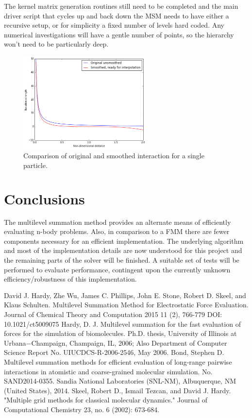 \documentclass[review]{siamart}
\begin{document}
The kernel matrix generation routines still need to be completed and the main driver script that cycles up and back down the MSM needs to have either a recursive setup, or for simplicity a fixed number of levels hard coded. Any numerical investigations will have a gentle number of points, so the hierarchy won't need to be particularly deep.



\begin{figure}[!htb]
\centering
\includegraphics[width=0.6\textwidth]{smooth.PNG}
\caption{Comparison of original and smoothed interaction for a single particle.}
\end{figure}

\section{Conclusions}\label{sec:conc}
The multilevel summation method provides an alternate means of efficiently evaluating n-body problems. Also, in comparison to a FMM there are fewer components necessary for an efficient implementation. The underlying algorithm and most of the implementation details are now understood for this project and the remaining parts of the solver will be finished. A suitable set of tests will be performed to evaluate performance, contingent upon the currently unknown efficiency/robustness of this implementation.

\begin{thebibliography}{3}
 David J. Hardy, Zhe Wu, James C. Phillips, John E. Stone, Robert D. Skeel, and Klaus Schulten. Multilevel Summation Method for Electrostatic Force Evaluation. Journal of Chemical Theory and Computation 2015 11 (2), 766-779 DOI: 10.1021/ct5009075
Hardy, D. J. Multilevel summation for the fast evaluation of forces for the simulation of biomolecules. Ph.D. thesis, University of Illinois at Urbana−Champaign, Champaign, IL, 2006; Also Department of Computer Science Report No. UIUCDCS-R-2006-2546, May 2006.
Bond, Stephen D. Multilevel summation methods for efficient evaluation of long-range pairwise interactions in atomistic and coarse-grained molecular simulation. No. SAND2014-0355. Sandia National Laboratories (SNL-NM), Albuquerque, NM (United States), 2014.
Skeel, Robert D., Ismail Tezcan, and David J. Hardy. "Multiple grid methods for classical molecular dynamics." Journal of Computational Chemistry 23, no. 6 (2002): 673-684.

\end{thebibliography}
\end{document}
